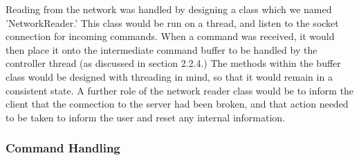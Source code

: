 Reading from the network was handled by designing a class which we named 'NetworkReader.' This class would be run on a thread, and listen to the socket connection for incoming commands. When a command was received, it would then place it onto the intermediate command buffer to be handled by the controller thread (as discussed in section 2.2.4.) The methods within the buffer class would be designed with threading in mind, so that it would remain in a consistent state. A further role of the network reader class would be to inform the client that the connection to the server had been broken, and that action needed to be taken to inform the user and reset any internal information.

\subsubsection {Command Handling }
















